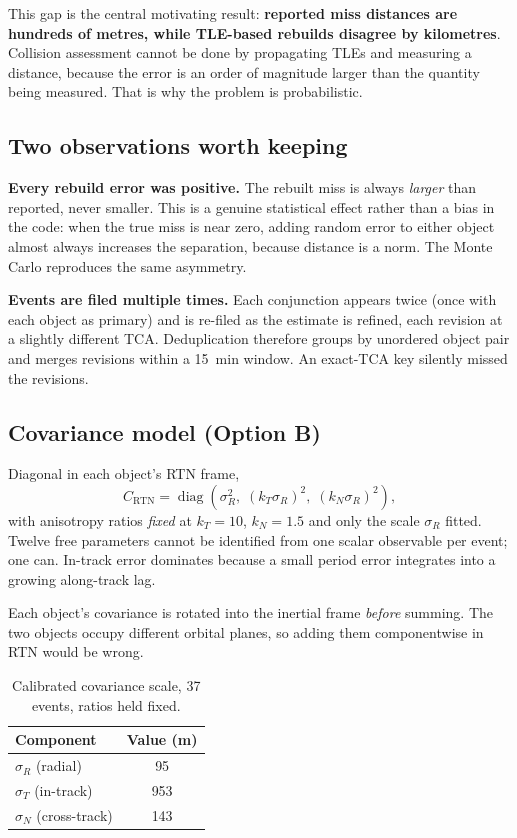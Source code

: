 \documentclass[11pt]{article}
\begin{document}
This gap is the central motivating result: \textbf{reported miss distances
are hundreds of metres, while TLE-based rebuilds disagree by kilometres}.
Collision assessment cannot be done by propagating TLEs and measuring a
distance, because the error is an order of magnitude larger than the
quantity being measured. That is why the problem is probabilistic.

\subsection{Two observations worth keeping}

\textbf{Every rebuild error was positive.} The rebuilt miss is always
\emph{larger} than reported, never smaller. This is a genuine statistical
effect rather than a bias in the code: when the true miss is near zero,
adding random error to either object almost always increases the
separation, because distance is a norm. The Monte Carlo reproduces the
same asymmetry.

\textbf{Events are filed multiple times.} Each conjunction appears twice
(once with each object as primary) and is re-filed as the estimate is
refined, each revision at a slightly different TCA. Deduplication
therefore groups by unordered object pair and merges revisions within a
\SI{15}{\minute} window. An exact-TCA key silently missed the revisions.

\subsection{Covariance model (Option B)}

Diagonal in each object's RTN frame,
\begin{equation}
  C_{\text{RTN}} = \operatorname{diag}\!\left(\sigma_R^2,\;
    (k_T\sigma_R)^2,\; (k_N\sigma_R)^2\right),
  \label{eq:covb}
\end{equation}
with anisotropy ratios \emph{fixed} at $k_T = 10$, $k_N = 1.5$ and only
the scale $\sigma_R$ fitted. Twelve free parameters cannot be identified
from one scalar observable per event; one can. In-track error dominates
because a small period error integrates into a growing along-track lag.

Each object's covariance is rotated into the inertial frame \emph{before}
summing. The two objects occupy different orbital planes, so adding them
componentwise in RTN would be wrong.

\begin{table}[htbp]
\centering
\caption{Calibrated covariance scale, 37 events, ratios held fixed.}
\label{tab:calib}
\begin{tabular}{lS[table-format=4.0]}
\toprule
Component & {Value (\si{\meter})} \\
\midrule
$\sigma_R$ (radial)      & 95 \\
$\sigma_T$ (in-track)    & 953 \\
$\sigma_N$ (cross-track) & 143 \\
\bottomrule
\end{tabular}
\end{table}
\end{document}

